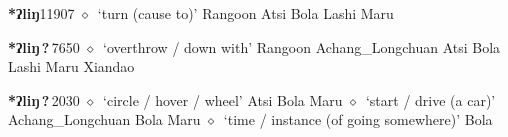   \begin{list}{}{\leftmargin=1.5em \itemindent=-1.5em}
  \item {\footnotesize \textbf{*ʔliŋ}}{\tiny 11907}
         $\diamond$~`turn (cause to)'
         Rangoon 
\hspace{1ex}
         Atsi 
\hspace{1ex}
         Bola 
\hspace{1ex}
         Lashi 
\hspace{1ex}
         Maru 
  \item {\footnotesize \textbf{*ʔliŋ\,?\,}}{\tiny 7650}
\hspace{1ex}
         $\diamond$~`overthrow / down with'
         Rangoon 
\hspace{1ex}
         Achang\_Longchuan 
\hspace{1ex}
         Atsi 
\hspace{1ex}
         Bola 
\hspace{1ex}
         Lashi 
\hspace{1ex}
         Maru 
\hspace{1ex}
         Xiandao 
  \item {\footnotesize \textbf{*ʔliŋ\,?\,}}{\tiny 2030}
\hspace{1ex}
         $\diamond$~`circle / hover / wheel'
         Atsi 
\hspace{1ex}
         Bola 
\hspace{1ex}
         Maru 
\hspace{1ex}
         $\diamond$~`start / drive (a car)'
         Achang\_Longchuan 
\hspace{1ex}
         Bola 
\hspace{1ex}
         Maru 
\hspace{1ex}
         $\diamond$~`time / instance (of going somewhere)'
         Bola 
\hspace{1ex}

\end{list}

